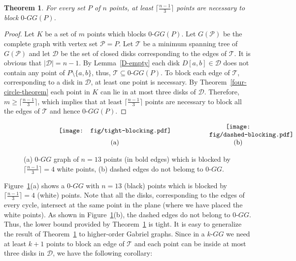 \documentclass[11pt,a4paper]{article}
\newcommand{\kGG}[2]{$#1\text{-}GG#2$}
\newcommand{\CD}[2]{D[#1,#2]}
\newtheorem{theorem}{Theorem}
\begin{document}
\begin{theorem}
\label{blocking-thr1}
For every set $P$ of $n$ points, at least $\lceil\frac{n-1}{3}\rceil$ points are necessary to block \kGG{0}{(P)}.
\end{theorem}
\begin{proof}
Let $K$ be a set of $m$ points which blocks \kGG{0}{(P)}. Let $G(\mathcal{P})$ be the complete graph with vertex set $\mathcal{P}=P$. Let $\mathcal{T}$ be a minimum spanning tree of $G(\mathcal{P})$ and let $\mathcal{D}$ be the set of closed disks corresponding to the edges of $\mathcal{T}$. It is obvious that $|\mathcal{D}|=n-1$. By Lemma~\ref{D-empty} each disk $\CD{a}{b}\in\mathcal{D}$ does not contain any point of $P\setminus\{a,b\}$, thus,  $\mathcal{T}\subseteq\text{\kGG{0}{(P)}}$. To block each edge of $\mathcal{T}$, corresponding to a disk in $\mathcal{D}$, at least one point is necessary. By Theorem~\ref{four-circle-theorem} each point in $K$ can lie in at most three disks of $\mathcal{D}$. Therefore, $m\ge\lceil\frac{n-1}{3}\rceil$, which implies that at least $\lceil\frac{n-1}{3}\rceil$ points are necessary to block all the edges of $\mathcal{T}$ and hence \kGG{0}{(P)}.
\end{proof}
\begin{figure}[htb]
  \centering
\setlength{\tabcolsep}{0in}
  $\begin{tabular}{cc}
 \multicolumn{1}{m{.75\columnwidth}}{\centering\texttt{[image: fig/tight-blocking.pdf]}}
&\multicolumn{1}{m{.25\columnwidth}}{\centering\texttt{[image: fig/dashed-blocking.pdf]}}\\
(a)&(b)
\end{tabular}$
  \caption{(a) \kGG{0}{} graph of $n=13$ points (in bold edges) which is blocked by $\lceil\frac{n-1}{3}\rceil=4$ white points, (b) dashed edges do not belomg to \kGG{0}{}.}
\label{blocking-fig}
\end{figure}

Figure~\ref{blocking-fig}(a) shows a \kGG{0}{} with $n=13$ (black) points which is blocked by $\lceil\frac{n-1}{3}\rceil=4$ (white) points. Note that all the disks, corresponding to the edges of every cycle, intersect at the same point in the plane (where we have placed the white points). As shown in Figure~\ref{blocking-fig}(b), the dashed edges do not belong to \kGG{0}{}. Thus, the lower bound provided by Theorem~\ref{blocking-thr1} is tight. It is easy to generalize the result of Theorem~\ref{blocking-thr1} to higher-order Gabriel graphs. Since in a \kGG{k}{} we need at least $k+1$ points to block an edge of $\mathcal{T}$ and each point can be inside at most three disks in $\mathcal{D}$, we have the following corollary:
\end{document}
